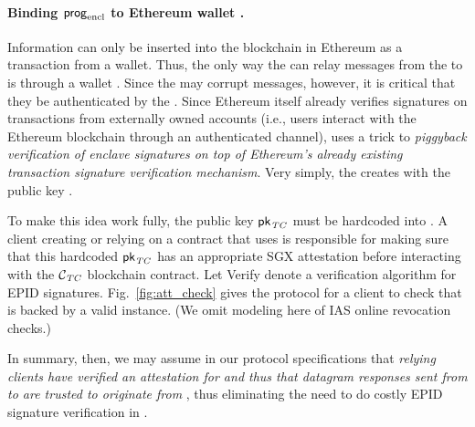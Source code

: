 
\iffalse
\paragraph{Binding ${\sf prog}_{\textrm{encl}}$ to Ethereum wallet \tcadd.}
Information can only be inserted into the blockchain in Ethereum as a transaction from a wallet.
Thus, the only way the \medname can relay messages from the \encname to \tcont is through a wallet \tcadd.
Since the \medname may corrupt messages, however, it is critical that they be authenticated by the \encname.
Since Ethereum itself already verifies signatures on transactions from externally owned accounts
(i.e., users interact with the  Ethereum blockchain through an authenticated channel),
\tc uses a trick to {\it piggyback verification of enclave signatures on top of Ethereum's already existing transaction signature verification mechanism}. 
Very simply, the \encname creates \tcadd with the public key \pkTC. 

To make this idea work fully, the public key ${\sf pk}_{\it TC}$ must be hardcoded into \tcont. A client creating or relying on a contract that uses \tcont is responsible for making sure that this hardcoded ${\sf pk}_{\it TC}$ has an appropriate SGX attestation before interacting with the $\tcont$  blockchain contract.  Let {\sf Verify} denote a verification algorithm for EPID signatures. Fig.~\ref{fig:att_check} gives the protocol for a client to check that \tcont is backed by a valid \encname instance. (We omit modeling here of IAS online revocation checks.)


In summary, then, we may assume in our protocol specifications that {\em relying clients have verified an attestation for \encname and thus that datagram responses sent from \tcadd to \tcont are trusted to originate from \engine}, thus eliminating the need to do costly EPID signature verification in \tcont.



